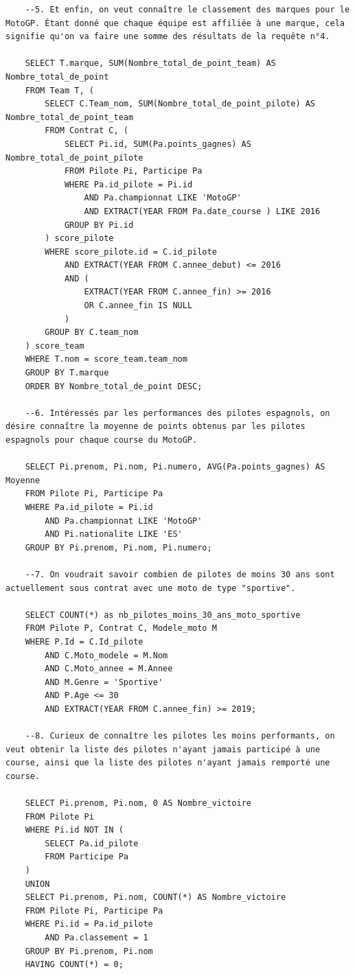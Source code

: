 \documentclass[12pt,a4paper]{article}
\newenvironment{code}{\captionsetup{type=listing}}{}
\begin{document}
\begin{code}
\begin{verbatim}
    --5. Et enfin, on veut connaître le classement des marques pour le MotoGP. Étant donné que chaque équipe est affiliée à une marque, cela signifie qu'on va faire une somme des résultats de la requête n°4.

    SELECT T.marque, SUM(Nombre_total_de_point_team) AS Nombre_total_de_point
    FROM Team T, (
        SELECT C.Team_nom, SUM(Nombre_total_de_point_pilote) AS Nombre_total_de_point_team
        FROM Contrat C, (
            SELECT Pi.id, SUM(Pa.points_gagnes) AS Nombre_total_de_point_pilote
            FROM Pilote Pi, Participe Pa
            WHERE Pa.id_pilote = Pi.id
                AND Pa.championnat LIKE 'MotoGP'
                AND EXTRACT(YEAR FROM Pa.date_course ) LIKE 2016
            GROUP BY Pi.id
        ) score_pilote
        WHERE score_pilote.id = C.id_pilote
            AND EXTRACT(YEAR FROM C.annee_debut) <= 2016
            AND (
                EXTRACT(YEAR FROM C.annee_fin) >= 2016
                OR C.annee_fin IS NULL
            )
        GROUP BY C.team_nom
    ) score_team
    WHERE T.nom = score_team.team_nom
    GROUP BY T.marque
    ORDER BY Nombre_total_de_point DESC;
    
    --6. Intéressés par les performances des pilotes espagnols, on désire connaître la moyenne de points obtenus par les pilotes espagnols pour chaque course du MotoGP.

    SELECT Pi.prenom, Pi.nom, Pi.numero, AVG(Pa.points_gagnes) AS Moyenne
    FROM Pilote Pi, Participe Pa
    WHERE Pa.id_pilote = Pi.id
        AND Pa.championnat LIKE 'MotoGP'
        AND Pi.nationalite LIKE 'ES'
    GROUP BY Pi.prenom, Pi.nom, Pi.numero;
    
    --7. On voudrait savoir combien de pilotes de moins 30 ans sont actuellement sous contrat avec une moto de type "sportive".

    SELECT COUNT(*) as nb_pilotes_moins_30_ans_moto_sportive
    FROM Pilote P, Contrat C, Modele_moto M
    WHERE P.Id = C.Id_pilote
        AND C.Moto_modele = M.Nom
        AND C.Moto_annee = M.Annee
        AND M.Genre = 'Sportive'
        AND P.Age <= 30
        AND EXTRACT(YEAR FROM C.annee_fin) >= 2019;
        
    --8. Curieux de connaître les pilotes les moins performants, on veut obtenir la liste des pilotes n'ayant jamais participé à une course, ainsi que la liste des pilotes n'ayant jamais remporté une course.

    SELECT Pi.prenom, Pi.nom, 0 AS Nombre_victoire
    FROM Pilote Pi
    WHERE Pi.id NOT IN (
        SELECT Pa.id_pilote
        FROM Participe Pa
    )
    UNION
    SELECT Pi.prenom, Pi.nom, COUNT(*) AS Nombre_victoire
    FROM Pilote Pi, Participe Pa
    WHERE Pi.id = Pa.id_pilote
        AND Pa.classement = 1
    GROUP BY Pi.prenom, Pi.nom
    HAVING COUNT(*) = 0;   
    

\end{verbatim}
\end{code}
\end{document}

